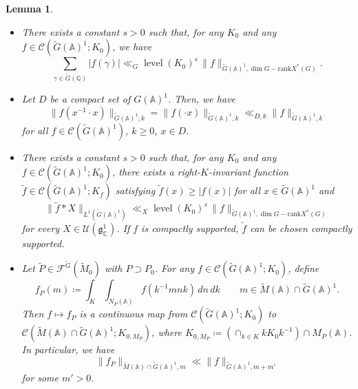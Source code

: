 \documentclass[12pt]{amsart}
\theoremstyle{definition}
\theoremstyle{plain}
\newtheorem{lemma}[definition]{Lemma}
\theoremstyle{remark}
\def\C{\mathbb{C}}%
\def\Q{\mathbb{Q}}%
\def\A{\mathbb{A}}%
\newcommand{\cC}{\mathcal{C}}
\newcommand{\cF}{\mathcal{F}}
\numberwithin{equation}{section}
\newcommand{\tG}{\widetilde{G}}
\newcommand{\tM}{\widetilde{M}}
\newcommand{\tP}{\widetilde{P}}
\newcommand{\tf}{\tilde{f}}
\newcommand{\level}{\operatorname{level}}
\begin{document}
\begin{lemma}
    
\begin{itemize}\label{lem:1}
    \item[(1)] There exists a constant $s>0$ such that, for any $K_0$ and any $f\in\cC(\tG(\A)^1;K_0)$, we have
\begin{equation*}
 \sum_{\gamma\in \tG(\Q)}|f(\gamma)|
 \ll_{G}
 \level(K_0)^s \, \|f\|_{\tG(\A)^1, \dim G-\mathrm{rank}X^*(G)} .   
\end{equation*}

\item[(2)]
Let $D$ be a compact set of $G(\mathbb A)^1$. %
Then, we have 
\begin{equation}\label{eq:2}
 \|f(x^{-1}\cdot x)\|_{\tG(\A)^1,k} = \|f(\cdot x)\|_{\tG(\A)^1,k} \ll_{D,k} \|f\|_{\tG(\A)^1,k}    
\end{equation}
for all $f\in\cC(\tG(\A)^1)$, $k\geq0$, $x\in D$.

\item[(3)]
There exists a constant $s>0$ such that, for any $K_0$ and any $f\in\cC(\tG(\A)^1;K_0)$, there exists a right-$K$-invariant function $\tf\in\cC(\tG(\A)^1;K_f)$ satisfying $\tf(x)\geq |f(x)|$ for all $x\in\tG(\A)^1$ and
\begin{equation}\label{eq:3}
 \|\tilde f*X\|_{L^1(\tG(\mathbb A)^1)}
 \ll_X
  \level(K_0)^s\, \|f\|_{\tG(\A)^1, \dim G-\mathrm{rank}X^*(G)}     
\end{equation}
for every $X\in\mathcal U(\mathfrak g^1_\C)$.
If $f$ is compactly supported, $\tilde f$ can be chosen compactly supported.


\item[(4)]
Let $\tP\in\cF^{\tG}(\tM_0)$ with $P\supset P_0$. 
For any $f\in\cC(\tG(\A)^1;K_0)$, define
\begin{equation*}
 f_P(m)
 \coloneqq
 \int_{K}\int_{N_P(\A)}
 f(k^{-1}mnk)\,dn\,dk
 \qquad m\in \tM(\mathbb A)\cap\tG(\A)^1.
\end{equation*}
Then $f\mapsto f_P$ is a continuous map from $\cC(\tG(\mathbb A)^1;K_0)$ to $\cC(\tM(\mathbb A)\cap\tG(\A)^1;K_{0,M_P})$, where $K_{0,M_P}\coloneqq \left(\cap_{k\in K}kK_0 k^{-1}\right) \cap M_P(\A)$.
In particular, we have 
\[
\| f_P \|_{\tM(\A)\cap \tG(\A)^1,m}\ll \| f \|_{\tG(\A)^1,m+m'}
\]
for some $m'>0$.
\fi
\end{itemize}
\end{lemma}
\end{document}
